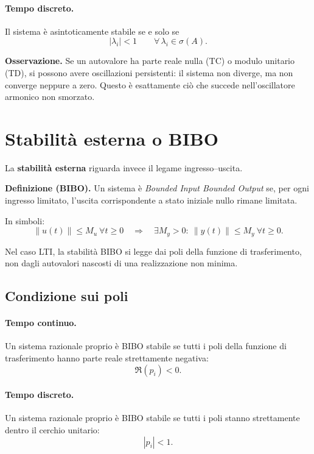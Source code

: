 \paragraph{Tempo discreto.}
Il sistema è asintoticamente stabile se e solo se
\[
|\lambda_i|<1
\qquad \forall\, \lambda_i\in\sigma(A).
\]

\medskip

\noindent
\textbf{Osservazione.}
Se un autovalore ha parte reale nulla (TC) o modulo unitario (TD), si possono avere oscillazioni persistenti: il sistema non diverge, ma non converge neppure a zero. Questo è esattamente ciò che succede nell'oscillatore armonico non smorzato.

\bigskip

\section{Stabilità esterna o BIBO}

La \textbf{stabilità esterna} riguarda invece il legame ingresso--uscita.

\medskip

\noindent
\textbf{Definizione (BIBO).}
Un sistema è \emph{Bounded Input Bounded Output} se, per ogni ingresso limitato, l'uscita corrispondente a stato iniziale nullo rimane limitata.

In simboli:
\[
\|u(t)\|\le M_u\ \forall t\ge 0
\quad\Longrightarrow\quad
\exists M_y>0:\ \|y(t)\|\le M_y\ \forall t\ge 0.
\]

Nel caso LTI, la stabilità BIBO si legge dai poli della funzione di trasferimento, non dagli autovalori nascosti di una realizzazione non minima.

\subsection{Condizione sui poli}

\paragraph{Tempo continuo.}
Un sistema razionale proprio è BIBO stabile se tutti i poli della funzione di trasferimento hanno parte reale strettamente negativa:
\[
\Re(p_i)<0.
\]

\paragraph{Tempo discreto.}
Un sistema razionale proprio è BIBO stabile se tutti i poli stanno strettamente dentro il cerchio unitario:
\[
|p_i|<1.
\]


